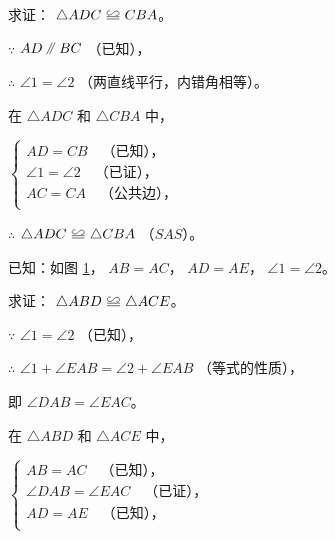 求证： $\triangle ADC \quandeng CBA$。

\zhengming $\because$ \quad $AD \pingxing BC$ （已知），

$\therefore$ \quad $\angle 1 = \angle 2$ （两直线平行，内错角相等）。

在 $\triangle ADC$ 和 $\triangle CBA$ 中，

\hspace{2em}$\begin{cases}
    AD = CB \quad \text{（已知），} \\
    \angle 1 = \angle 2  \quad \text{（已证），} \\
    AC = CA  \quad \text{（公共边），} \\
\end{cases}$

$\therefore$ \quad $\triangle ADC \quandeng \triangle CBA$ （$SAS$）。


\begin{figure}[htbp]
    \centering
    \begin{minipage}[b]{7cm}
        \centering
        
        \caption{}\label{fig:czjh1-3-18}
    \end{minipage}
    \qquad
    \begin{minipage}[b]{7cm}
        \centering
        
        \caption{}\label{fig:czjh1-3-19}
    \end{minipage}
\end{figure}

\liti 已知：如图 \ref{fig:czjh1-3-19}， $AB = AC$， $AD = AE$， $\angle 1 = \angle 2$。

求证： $\triangle ABD \quandeng \triangle ACE$。

\zhengming $\because$ \quad $\angle 1 = \angle 2$ （已知），

$\therefore$ \quad $\angle 1 + \angle EAB = \angle 2 + \angle EAB$ （等式的性质），

即  $\angle DAB = \angle EAC$。

在 $\triangle ABD$ 和 $\triangle ACE$ 中，

\hspace{2em}$\begin{cases}
    AB = AC \quad \text{（已知），} \\
    \angle DAB = \angle EAC \quad \text{（已证），} \\
    AD = AE \quad \text{（已知），} \\
\end{cases}$

